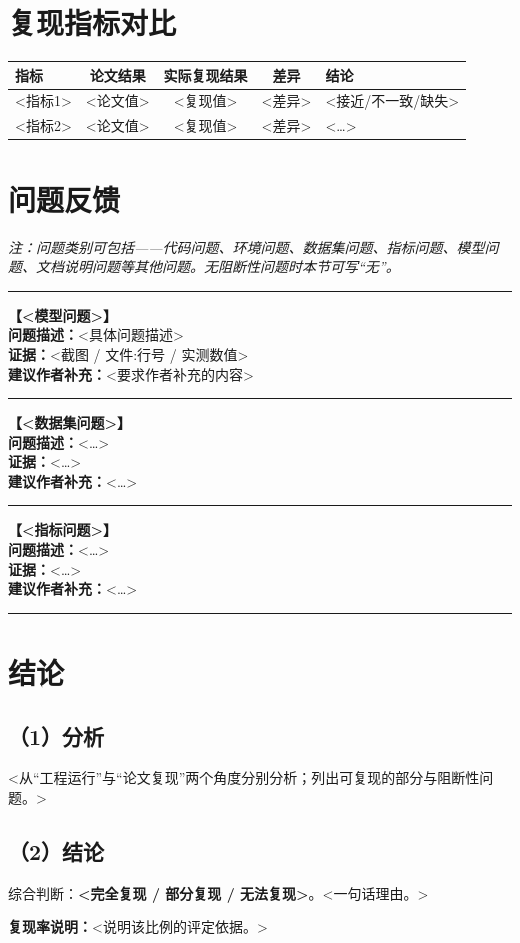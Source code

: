\documentclass[11pt]{article}
\newcommand{\verdict}[1]{{\bfseries #1}}
\newcommand{\issue}[4]{%
  \par\smallskip
  \noindent\textbf{【#1】}\\
  \textbf{问题描述：}#2\\
  \textbf{证据：}#3\\
  \textbf{建议作者补充：}#4
  \par\smallskip\hrule\smallskip
}
\begin{document}
\section{复现指标对比}
\begin{center}
\begin{longtable}{p{4.5cm} c c c p{3cm}}
\toprule
指标 & 论文结果 & 实际复现结果 & 差异 & 结论 \\
\midrule
\endhead
<指标1> & <论文值> & <复现值> & <差异> & <接近/不一致/缺失> \\
<指标2> & <论文值> & <复现值> & <差异> & <…> \\
\bottomrule
\end{longtable}
\end{center}

\section{问题反馈}
\noindent\textit{注：问题类别可包括——代码问题、环境问题、数据集问题、指标问题、模型问题、文档说明问题等其他问题。无阻断性问题时本节可写“无”。}

\medskip
\hrule\smallskip
\issue{<模型问题>}{<具体问题描述>}{<截图 / 文件:行号 / 实测数值>}{<要求作者补充的内容>}
\issue{<数据集问题>}{<…>}{<…>}{<…>}
\issue{<指标问题>}{<…>}{<…>}{<…>}

\section{结论}

\subsection*{（1）分析}
<从“工程运行”与“论文复现”两个角度分别分析；列出可复现的部分与阻断性问题。>

\subsection*{（2）结论}
综合判断：\verdict{<完全复现 / 部分复现 / 无法复现>}。<一句话理由。>

\bigskip
{}

\medskip
\noindent\textbf{复现率说明：}<说明该比例的评定依据。>
\end{document}
